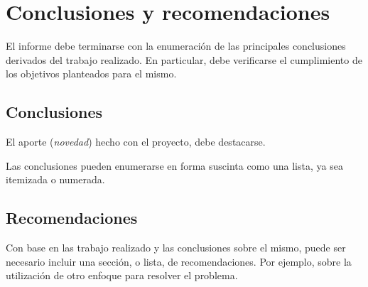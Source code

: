   \chapter{Conclusiones y recomendaciones}
\label{C:conclusiones}

El informe debe terminarse con la enumeración de las principales conclusiones derivados del trabajo realizado.  En particular, debe verificarse el cumplimiento de los objetivos planteados para el mismo.

\section{Conclusiones}
El aporte (\emph{novedad}) hecho con el proyecto, debe destacarse.

Las conclusiones pueden enumerarse en forma suscinta como una lista, ya sea itemizada o numerada.

\section{Recomendaciones}
Con base en las trabajo realizado y las conclusiones sobre el mismo, puede ser necesario incluir una sección, o lista, de recomendaciones.  Por ejemplo, sobre la utilización de otro enfoque para resolver el problema.